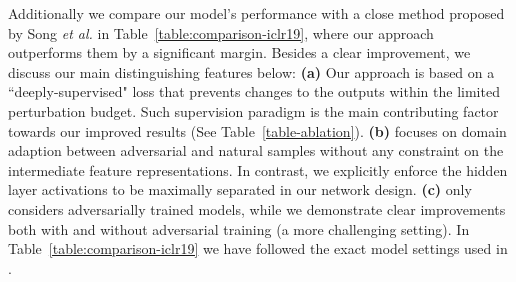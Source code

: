 \documentclass[10pt,twocolumn,letterpaper]{article}
\begin{document}
\begin{table}[!htp]
\caption{\small{Comparison on \textbf{CIFAR-100} dataset for \textit{white-box} adversarial attacks (numbers shows robustness, higher is better).  sign denotes adversarially trained models. For our model, we report results without adversarial training (Ours) and with adversarially generated images from FGSM (Ours) and PGD (Ours ) attacks.}} \vspace{-1.5em}
\label{table-cifar100-comparison}
\begin{center}
\vspace{-1.5em}
\end{center}
\end{table}

Additionally we compare our model's performance with a close method proposed by Song \textit{et al.} \cite{song2018improving} in Table~\ref{table:comparison-iclr19}, where our approach outperforms them by a significant margin. Besides a clear improvement, we discuss our main distinguishing features below: \textbf{(a)} Our approach is based on a ``deeply-supervised" loss that prevents changes to the outputs within the limited perturbation budget. Such supervision paradigm is the main contributing factor towards our improved results (See Table~\ref{table-ablation}). \textbf{(b)} \cite{song2018improving} focuses on domain adaption between adversarial and natural samples without any constraint on the intermediate feature representations. In contrast, we explicitly enforce the hidden layer activations to be maximally separated in our network design. \textbf{(c)} \cite{song2018improving} only considers adversarially trained models, while we demonstrate clear improvements both with and without adversarial training (a more challenging setting). In Table~\ref{table:comparison-iclr19} we have followed the exact model settings used in \cite{song2018improving}.
\end{document}
